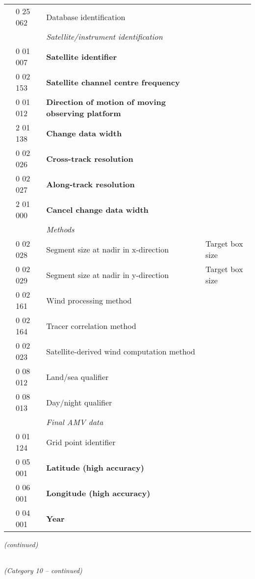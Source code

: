 \begin{longtable}[]{@{}llll@{}}
& 0 25 062 & Database identification &\tabularnewline
& & \emph{Satellite/instrument identification} &\tabularnewline
& 0 01 007 & \textbf{Satellite identifier} &\tabularnewline
& 0 02 153 & \textbf{Satellite channel centre frequency} &\tabularnewline
& 0 01 012 & \textbf{Direction of motion of moving observing platform} &\tabularnewline
& 2 01 138 & \textbf{Change data width} &\tabularnewline
& 0 02 026 & \textbf{Cross-track resolution} &\tabularnewline
& 0 02 027 & \textbf{Along-track resolution} &\tabularnewline
& 2 01 000 & \textbf{Cancel change data width} &\tabularnewline
& & \emph{Methods} &\tabularnewline
& 0 02 028 & Segment size at nadir in x-direction & Target box size\tabularnewline
& 0 02 029 & Segment size at nadir in y-direction & Target box size\tabularnewline
& 0 02 161 & Wind processing method &\tabularnewline
& 0 02 164 & Tracer correlation method &\tabularnewline
& 0 02 023 & Satellite-derived wind computation method &\tabularnewline
& 0 08 012 & Land/sea qualifier &\tabularnewline
& 0 08 013 & Day/night qualifier &\tabularnewline
& & \emph{Final AMV data} &\tabularnewline
& 0 01 124 & Grid point identifier &\tabularnewline
& 0 05 001 & \textbf{Latitude (high accuracy)} &\tabularnewline
& 0 06 001 & \textbf{Longitude (high accuracy)} &\tabularnewline
& 0 04 001 & \textbf{Year} &\tabularnewline
\bottomrule
\end{longtable}

\emph{(continued)}

\emph{\\
(Category 10 -- continued)}

